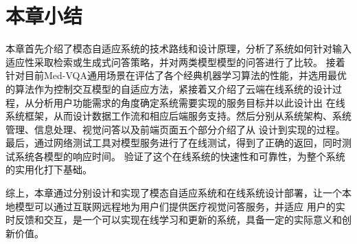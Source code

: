 	

\section{本章小结}
本章首先介绍了模态自适应系统的技术路线和设计原理，分析了系统如何针对输入适应性采取检索或生成式问答策略，并对两类模型模型的问答进行了比较。
接着针对目前Med-VQA通用场景在评估了各个经典机器学习算法的性能，并选用最优的算法作为控制交互模型的自适应方法，紧接着又介绍了云端在线系统的设计过程，从分析用户功能需求的角度确定系统需要实现的服务目标并以此设计出
在线系统框架，从而设计数据工作流和相应后端服务支持。然后分别从系统架构、系统管理、信息处理、视觉问答以及前端页面五个部分介绍了从
设计到实现的过程。最后，通过网络测试工具对模型服务进行了在线测试，得到了正确的返回，同时测试系统各模型的响应时间。
验证了这个在线系统的快速性和可靠性，为整个系统的实用化打下基础。

综上，本章通过分别设计和实现了模态自适应系统和在线系统设计部署，让一个本地模型可以通过互联网远程地为用户们提供医疗视觉问答服务，并适应
用户的实时反馈和交互，是一个可以实现在线学习和更新的系统，具备一定的实际意义和创新价值。













